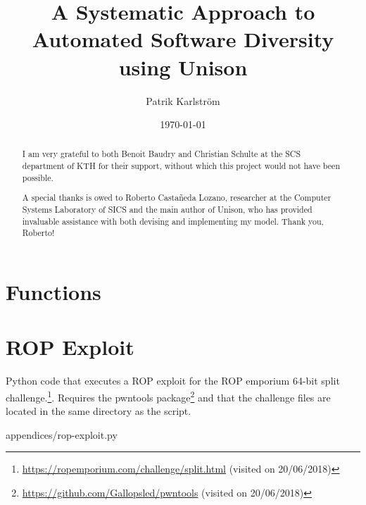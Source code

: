\documentclass{kththesis}
\title{A Systematic Approach to Automated Software Diversity using Unison}
\author{Patrik Karlström}
\date{\today}
\begin{document}
\frontmatter

\titlepage





\renewcommand{\abstractname}{Acknowledgements}
\begin{abstract}
I am very grateful to both Benoit Baudry and Christian Schulte at the SCS department of
KTH for their support, without which this project would not have been possible.

A special thanks is owed to Roberto Castañeda Lozano, researcher at the Computer Systems
Laboratory of SICS and the main author of Unison, who has provided invaluable assistance
with both devising and implementing my model. Thank you, Roberto!
\end{abstract}


\tableofcontents


\mainmatter











\printbibliography[heading=bibintoc] %

\appendix

\chapter{Functions}
\label{appendix:function_names}


\chapter{ROP Exploit}
\label{appendix:rop-exploit}

Python code that executes a ROP exploit for the ROP emporium 64-bit split challenge.\footnote{\url{https://ropemporium.com/challenge/split.html} (visited on 20/06/2018)}.
Requires the pwntools package\footnote{\url{https://github.com/Gallopsled/pwntools} (visited on 20/06/2018)} and that
the challenge files are located in the same directory as the script.


{appendices/rop-exploit.py}
\end{document}
